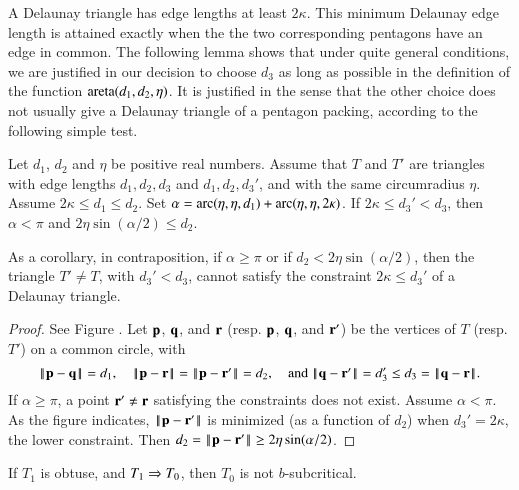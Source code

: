 A Delaunay triangle has edge lengths at least $2\kappa$.  This minimum
Delaunay edge length is attained exactly when the the two
corresponding pentagons have an edge in common.  The following lemma
shows that under quite general conditions, we are justified in our
decision to choose $d_3$ as long as possible in the definition of the
function ${\operatorname{areta}}(d_1,d_2,\eta)$.  It is justified in the sense that
the other choice does not usually give a Delaunay triangle of a
pentagon packing, according to the following simple test.

\begin{lemma}  
  Let $d_1$, $d_2$ and $\eta$ be positive real numbers.  Assume that
  $T$ and $T'$ are triangles with edge lengths $d_1,d_2,d_3$ and
  $d_1,d_2,d_3'$, and with the same circumradius $\eta$. Assume
  $2\kappa\le d_1\le d_2$.  Set $\alpha =
  \operatorname{arc}(\eta,\eta,d_1)+\operatorname{arc}(\eta,\eta,2\kappa)$.  If $2\kappa \le d_3'
  < d_3$, then $\alpha < \pi$ and $2\eta\sin(\alpha/2) \le d_2$.
\end{lemma}

As a corollary, 
in contraposition, if $\alpha\ge\pi$ or if $d_2 < 2\eta\sin(\alpha/2)$,
then the triangle $T'\ne T$, with $d_3' < d_3$,
cannot satisfy the constraint $2\kappa\le d_3'$ of a  Delaunay triangle.


\begin{proof} 
  See Figure .  Let ${\mathbf p}$, ${\mathbf q}$, and ${\mathbf r}$ (resp. ${\mathbf p}$,
  ${\mathbf q}$, and ${\mathbf r}'$) be the vertices of $T$ (resp. $T'$) on a common
  circle, with
\[
\norm{\p}{\q} =d_1, 
\quad\norm{\p}{\r}=\norm{\p}{\r'}=d_2, \quad\text{and } 
\norm{\q}{\r'} = d_3' \le d_3=\norm{\q}{\r}.
\]
If $\alpha\ge\pi$, a point ${\mathbf r}'\ne {\mathbf r}$ satisfying the constraints does
not exist.  Assume $\alpha < \pi$.  As the figure indicates,
$\norm{\p}{\r'}$ is minimized (as a function of $d_2$) when $d_3' =
2\kappa$, the lower constraint.  Then $d_2 = \norm{\p}{\r'}\ge
2\eta\sin(\alpha/2)$.
\end{proof}



\begin{lemma}
  If $T_1$ is obtuse, and $T_1 \Rightarrow T_0$, then $T_0$ is not
  $b$-subcritical.
\end{lemma}


